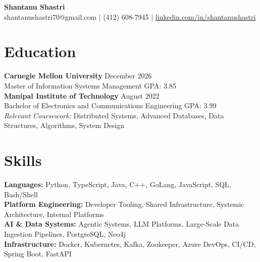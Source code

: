 \documentclass[11pt,a4paper]{article}
\begin{document}
\begin{center}
    \Huge \textbf{Shantanu Shastri} \\
    \vspace{2pt}
    \small shantanushastri70@gmail.com $|$ (412) 608-7945 $|$ \href{https://linkedin.com/in/shantanushastri}{linkedin.com/in/shantanushastri}
\end{center}

\vspace{-5pt}
\section{Education}
\noindent
\textbf{Carnegie Mellon University} \hfill December 2026 \\
Master of Information Systems Management \hfill GPA: 3.85 \\
\textbf{Manipal Institute of Technology} \hfill August 2022 \\
Bachelor of Electronics and Communications Engineering \hfill GPA: 3.99 \\
\textit{Relevant Coursework:} Distributed Systems, Advanced Databases, Data Structures, Algorithms, System Design

\vspace{-5pt}
\section{Skills}
\noindent
\textbf{Languages:} Python, TypeScript, Java, C++, GoLang, JavaScript, SQL, Bash/Shell \\
\textbf{Platform Engineering:} Developer Tooling, Shared Infrastructure, Systemic Architecture, Internal Platforms \\
\textbf{AI \& Data Systems:} Agentic Systems, LLM Platforms, Large-Scale Data Ingestion Pipelines, PostgreSQL, Neo4j \\
\textbf{Infrastructure:} Docker, Kubernetes, Kafka, Zookeeper, Azure DevOps, CI/CD, Spring Boot, FastAPI

\vspace{-5pt}
\end{document}
